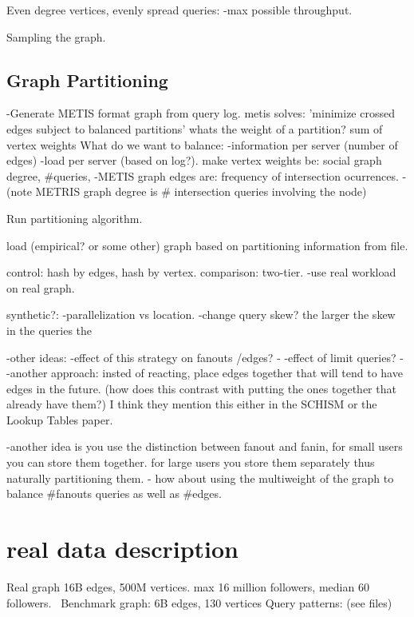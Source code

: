 \documentclass{article}
\begin{document}
Even degree vertices, evenly spread queries:
-max possible throughput.

Sampling the graph. 

\subsection{Graph Partitioning}

-Generate METIS format graph from query log.
metis solves: 'minimize crossed edges subject to balanced partitions'
whats the weight of a partition? sum of vertex weights
What do we want to balance:
-information per server (number of edges)
-load per server (based on log?). make vertex weights be: social graph degree, #queries, 
-METIS graph edges are: frequency of intersection ocurrences.
-(note METRIS graph degree is # intersection queries involving the node)

Run partitioning algorithm.

load (empirical? or some other) graph based on partitioning information from file.

control: hash by edges, hash by vertex. comparison: two-tier.
-use real workload on real graph.

synthetic?:
-parallelization vs location.
-change query skew? the larger the skew in the queries
the 


-other ideas:
-effect of this strategy on fanouts /edges? -
-effect of limit queries? -
-another approach: insted of reacting, place edges together that will tend to have edges in the future. (how does this contrast with putting the ones together that already have them?)
I think they mention this either in the SCHISM or the Lookup Tables paper.

-another idea is you use the distinction between fanout and fanin, for small users you can store them together. for large users you store them separately thus naturally partitioning them.
- how about using the multiweight of the graph  to balance #fanouts queries as well as #edges.

\section{real data description}

Real graph 16B edges, 500M vertices.
max 16 million followers, median 60 followers.
\
Benchmark graph: 6B edges, 130 vertices
Query patterns:  (see files)
\end{document}
